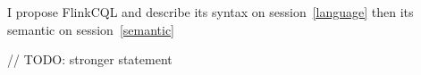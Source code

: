 I propose FlinkCQL and describe its syntax on session~\ref{language} then its semantic  on session~\ref{semantic}

// TODO: stronger statement












	
